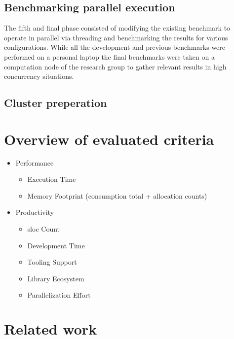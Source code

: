 \subsection{Benchmarking parallel execution}
\label{subsec:Concept::Implementation::ParallelBenchmark}

The fifth and final phase consisted of modifying the existing benchmark to operate in parallel via threading and benchmarking the results for various configurations. While all the development and previous benchmarks were performed on a personal laptop the final benchmarks were taken on a computation node of the research group to gather relevant results in high concurrency situations.

\subsection{Cluster preperation}
\label{subsec:Concept::Implementation::ClusterPreparation}

\section{Overview of evaluated criteria}
\label{sec:Concept::Criteria}

\begin{itemize}
    \item Performance
    \begin{itemize}
        \item Execution Time
        \item Memory Footprint (consumption total + allocation counts)
    \end{itemize}
    \item Productivity
    \begin{itemize}
        \item \acrshort{sloc} Count
        \item Development Time
        \item Tooling Support
        \item Library Ecosystem
        \item Parallelization Effort
    \end{itemize}
\end{itemize}

\section{Related work}
\label{sec:Concept::Related}


